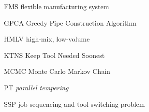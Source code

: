\begin{siglas}
    \item [FMS] flexible manufacturing system
    \item [GPCA] Greedy Pipe Construction Algorithm
    \item [HMLV] high-mix, low-volume
    \item [KTNS] Keep Tool Needed Soonest
    \item [MCMC] Monte Carlo Markov Chain
    \item [PT] \textit{parallel tempering}
    \item [SSP] job sequencing and tool switching problem
\end{siglas}